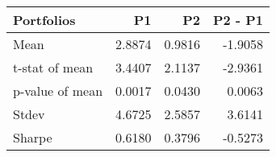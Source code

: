 \begin{tabular}{lrrr}
\toprule
Portfolios & P1 & P2 & P2 - P1 \\
\midrule
Mean & 2.8874 & 0.9816 & -1.9058 \\
t-stat of mean & 3.4407 & 2.1137 & -2.9361 \\
p-value of mean & 0.0017 & 0.0430 & 0.0063 \\
Stdev & 4.6725 & 2.5857 & 3.6141 \\
Sharpe & 0.6180 & 0.3796 & -0.5273 \\
\bottomrule
\end{tabular}

